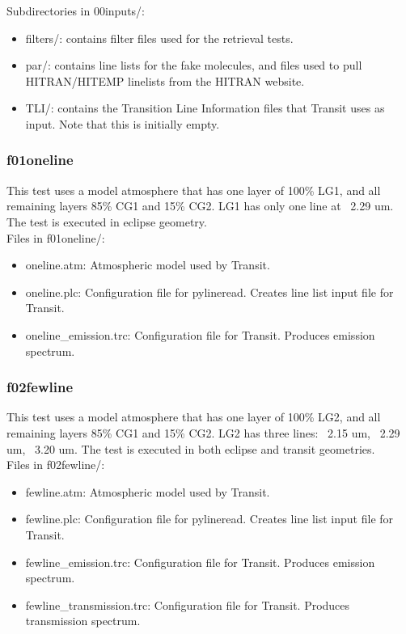 \documentclass[letterpaper, 12pt]{article}
\begin{document}
Subdirectories in 00inputs/:
\begin{itemize} \itemsep0pt
  \item filters/: contains filter files used for the retrieval tests.
  \item par/: contains line lists for the fake molecules, and files used to pull 
        HITRAN/HITEMP linelists from the HITRAN website.
  \item TLI/: contains the Transition Line Information files that Transit uses 
        as input. Note that this is initially empty.
\end{itemize}

\subsubsection{f01oneline}
\label{sec:oneline}
This test uses a model atmosphere that has one layer of 100\% LG1, and all 
remaining layers 85\% CG1 and 15\% CG2. LG1 has only one line at ~2.29 um. 
The test is executed in eclipse geometry.\\

Files in f01oneline/:
\begin{itemize} \itemsep0pt
  \item oneline.atm: Atmospheric model used by Transit.
  \item oneline.plc: Configuration file for pylineread. Creates line 
        list input file for Transit.
  \item oneline{\_}emission.trc: Configuration file for Transit. Produces 
        emission spectrum.
\end{itemize}

\subsubsection{f02fewline}
\label{sec:fewline}
This test uses a model atmosphere that has one layer of 100\% LG2, and all 
remaining layers 85\% CG1 and 15\% CG2. LG2 has three lines: ~2.15 um, 
~2.29 um, ~3.20 um. The test is executed in both eclipse and transit 
geometries.\\

Files in f02fewline/:
\begin{itemize} \itemsep0pt
  \item fewline.atm: Atmospheric model used by Transit.
  \item fewline.plc: Configuration file for pylineread. Creates line 
        list input file for Transit.
  \item fewline{\_}emission.trc: Configuration file for Transit. Produces 
        emission spectrum.
  \item fewline{\_}transmission.trc: Configuration file for Transit. Produces 
        transmission spectrum.
\end{itemize}
\end{document}
